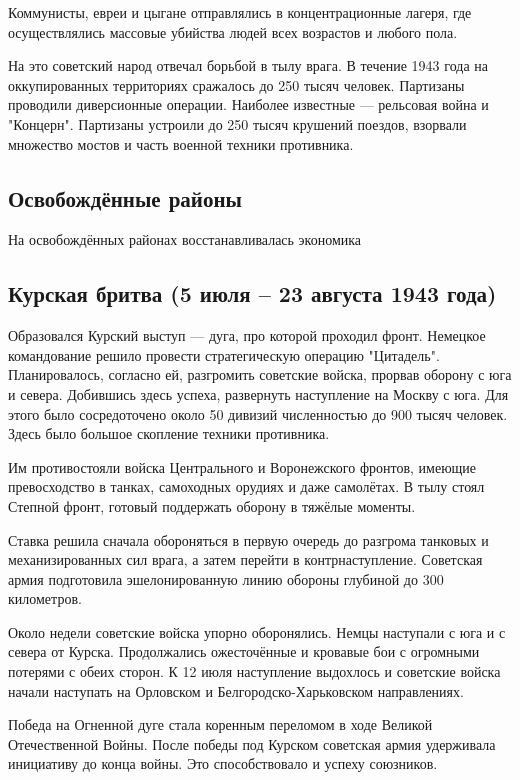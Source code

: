 \documentclass{article}
\begin{document}
Коммунисты, евреи и цыгане отправлялись в концентрационные лагеря, где осуществлялись массовые убийства людей всех возрастов и любого пола.

На это советский народ отвечал борьбой в тылу врага. В течение 1943 года на оккупированных территориях сражалось до 250 тысяч человек. Партизаны проводили диверсионные операции. Наиболее известные --- рельсовая война и "Концерн". Партизаны устроили до 250 тысяч крушений поездов, взорвали множество мостов и часть военной техники противника.

\subsection{Освобождённые районы}

На освобождённых районах восстанавливалась экономика

\subsection{Курская бритва (5 июля -- 23 августа 1943 года)}

Образовался Курский выступ --- дуга, про которой проходил фронт. Немецкое командование решило провести стратегическую операцию "Цитадель". Планировалось, согласно ей, разгромить советские войска, прорвав оборону с юга и севера. Добившись здесь успеха, развернуть наступление на Москву с юга. Для этого было сосредоточено около 50 дивизий численностью до 900 тысяч человек. Здесь было большое скопление техники противника.

Им противостояли войска Центрального и Воронежского фронтов, имеющие превосходство в танках, самоходных орудиях и даже самолётах. В тылу стоял Степной фронт, готовый поддержать оборону в тяжёлые моменты.

Ставка решила сначала обороняться в первую очередь до разгрома танковых и механизированных сил врага, а затем перейти в контрнаступление. Советская армия подготовила эшелонированную линию обороны глубиной до 300 километров.

Около недели советские войска упорно оборонялись. Немцы наступали с юга и с севера от Курска. Продолжались ожесточённые и кровавые бои с огромными потерями с обеих сторон. К 12 июля наступление выдохлось и советские войска начали наступать на Орловском и Белгородско-Харьковском направлениях.

Победа на Огненной дуге стала коренным переломом в ходе Великой Отечественной Войны. После победы под Курском советская армия удерживала инициативу до конца войны. Это способствовало и успеху союзников.
\end{document}
